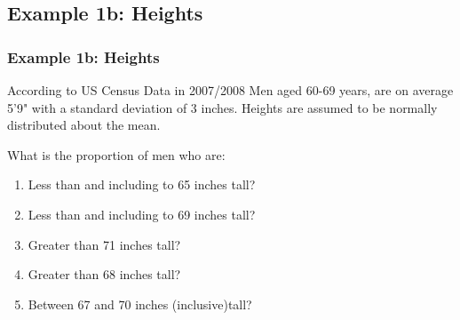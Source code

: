 \documentclass[12pt]{beamer}
\begin{document}
\subsection{Example 1b: Heights}
	\begin{frame}
		\frametitle{Example 1b: Heights}
		According to US Census Data in 2007/2008 Men aged 60-69 years, are on average 5'9" with a standard deviation of 3 inches. Heights are assumed to be normally distributed about the mean. \\
		\bigskip

		What is the proportion of men who are:
		\begin{enumerate}
			\item Less than and including to 65 inches tall?
			\item Less than and including to 69 inches tall?
			\item Greater than 71 inches tall?
			\item Greater than 68 inches tall?
			\item Between 67 and 70 inches (inclusive)tall? 
		\end{enumerate}
	\end{frame}
	
\end{document}
